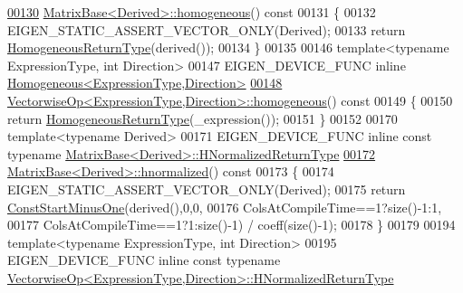 \begin{DoxyCode}
\hyperlink{group___geometry___module_ga8cd24704519bf35e1724e1915d477a35}{00130} \hyperlink{group___geometry___module_ga8cd24704519bf35e1724e1915d477a35}{MatrixBase<Derived>::homogeneous}()\textcolor{keyword}{ const}
00131 \textcolor{keyword}{}\{
00132   EIGEN\_STATIC\_ASSERT\_VECTOR\_ONLY(Derived);
00133   \textcolor{keywordflow}{return} \hyperlink{group___geometry___module_class_eigen_1_1_homogeneous}{HomogeneousReturnType}(derived());
00134 \}
00135 
00146 \textcolor{keyword}{template}<\textcolor{keyword}{typename} ExpressionType, \textcolor{keywordtype}{int} Direction>
00147 EIGEN\_DEVICE\_FUNC \textcolor{keyword}{inline} \hyperlink{group___geometry___module_class_eigen_1_1_homogeneous}{Homogeneous<ExpressionType,Direction>}
\hyperlink{group___geometry___module_ga7ae337c185a1de2343f12be4577c75fc}{00148} \hyperlink{group___geometry___module_ga7ae337c185a1de2343f12be4577c75fc}{VectorwiseOp<ExpressionType,Direction>::homogeneous}()\textcolor{keyword}{
       const}
00149 \textcolor{keyword}{}\{
00150   \textcolor{keywordflow}{return} \hyperlink{group___geometry___module_class_eigen_1_1_homogeneous}{HomogeneousReturnType}(\_expression());
00151 \}
00152 
00170 \textcolor{keyword}{template}<\textcolor{keyword}{typename} Derived>
00171 EIGEN\_DEVICE\_FUNC \textcolor{keyword}{inline} \textcolor{keyword}{const} \textcolor{keyword}{typename} 
      \hyperlink{group___core___module_class_eigen_1_1_matrix_base}{MatrixBase<Derived>::HNormalizedReturnType}
\hyperlink{group___geometry___module_gad7e913733107a9a1b61bff95ec9c03dd}{00172} \hyperlink{group___geometry___module_gad7e913733107a9a1b61bff95ec9c03dd}{MatrixBase<Derived>::hnormalized}()\textcolor{keyword}{ const}
00173 \textcolor{keyword}{}\{
00174   EIGEN\_STATIC\_ASSERT\_VECTOR\_ONLY(Derived);
00175   \textcolor{keywordflow}{return} \hyperlink{group___core___module_class_eigen_1_1_block}{ConstStartMinusOne}(derived(),0,0,
00176     ColsAtCompileTime==1?size()-1:1,
00177     ColsAtCompileTime==1?1:size()-1) / coeff(size()-1);
00178 \}
00179 
00194 \textcolor{keyword}{template}<\textcolor{keyword}{typename} ExpressionType, \textcolor{keywordtype}{int} Direction>
00195 EIGEN\_DEVICE\_FUNC \textcolor{keyword}{inline} \textcolor{keyword}{const} \textcolor{keyword}{typename} 
      \hyperlink{group___core___module_class_eigen_1_1_cwise_binary_op}{VectorwiseOp<ExpressionType,Direction>::HNormalizedReturnType}

\end{DoxyCode}

